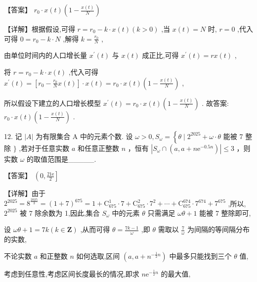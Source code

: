 \documentclass[10pt]{article}
\begin{document}
【答案】 \({r}_{0} \cdot  x\left( t\right) \left( {1 - \frac{x\left( t\right) }{N}}\right)\)

【详解】根据假设,可得 \(r = {r}_{0} - k \cdot  x\left( t\right) \left( {k > 0}\right)\) ,当 \(x\left( t\right)  = N\) 时, \(r = 0\) ,代入可得 \(0 = {r}_{0} - k \cdot  N\) ,解得 \(k = \frac{{r}_{0}}{N}\) ,

由单位时间内的人口增长量 \({x}^{\prime }\left( t\right)\) 与 \(x\left( t\right)\) 成正比,可得 \({x}^{\prime }\left( t\right)  = {rx}\left( t\right)\) ,

将 \(r = {r}_{0} - k \cdot  x\left( t\right)\) ,代入可得 \({x}^{\prime }\left( t\right)  = \left\lbrack  {{r}_{0} - \frac{{r}_{0}}{N}x\left( t\right) }\right\rbrack   \cdot  x\left( t\right)  = {r}_{0} \cdot  x\left( t\right) \left( {1 - \frac{x\left( t\right) }{N}}\right)\) ,

所以假设下建立的人口增长模型 \({x}^{\prime }\left( t\right)  = {r}_{0} \cdot  x\left( t\right) \left( {1 - \frac{x\left( t\right) }{N}}\right)\) . 故答案: \({r}_{0} \cdot  x\left( t\right) \left( {1 - \frac{x\left( t\right) }{N}}\right)\) .

12. 记 \(\left| A\right|\) 为有限集合 \(\mathrm{A}\) 中的元素个数. 设 \(\omega  > 0,{S}_{\omega } = \left\{  {\theta  \mid  {2}^{2025} + \omega  \cdot  \theta }\right.\) 能被 7 整除 \(\}\) ,若对于任意实数 \(a\) 和任意正整数 \(n\) ，恒有 \(\left| {{S}_{\omega } \cap  \left( {a,a + n{\mathrm{e}}^{-{0.5n}}}\right) }\right|  \leq  3\) ，则实数 \(\omega\) 的取值范围是\_\_\_\_\_.

【答案】 \(\left( {0,\frac{{21}\mathrm{e}}{2}}\right\rbrack\)

【详解】由于 \({2}^{2025} = {8}^{\frac{2025}{3}} = {\left( 1 + 7\right) }^{675} = 1 + {\mathrm{C}}_{675}^{1} \cdot  7 + {\mathrm{C}}_{675}^{2} \cdot  {7}^{2} + \cdots  + {\mathrm{C}}_{675}^{674} \cdot  {7}^{674} + {7}^{675}\) ,所以, \({2}^{2025}\) 被 7 除余数为 1,因此,集合 \({S}_{\omega }\) 中的元素 \(\theta\) 只需满足 \({\omega \theta } + 1\) 能被 7 整除即可,

设 \({\omega \theta } + 1 = {7k}\left( {k \in  \mathbf{Z}}\right)\) ,从而可得 \(\theta  = \frac{{7k} - 1}{\omega }\) ,即 \(\theta\) 需取以 \(\frac{7}{\omega }\) 为间隔的等间隔分布的实数,

不论实数 \(a\) 和正整数 \(n\) 如何选取,区间 \(\left( {a,a + {n}^{-\frac{1}{2}n}}\right)\) 中最多只能找到三个 \(\theta\) 值,

考虑到任意性,考虑区间长度最长的情况,即求 \(n{\mathrm{e}}^{-\frac{1}{2}n}\) 的最大值,
\end{document}
